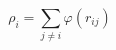 \documentclass[12pt]{article}
\begin{document}
$$
\rho_i = \sum_{j \neq i} \varphi(r_{ij})
$$
\end{document}
